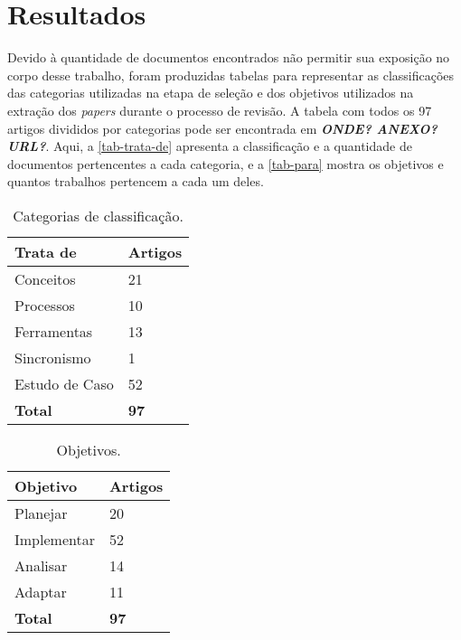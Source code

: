 \documentclass[
article,			%
11pt,				%
oneside,			%
a4paper,			%
english,			%
brazil,				%
sumario=tradicional
]{abntex2}
\begin{document}
  \section{Resultados}

  Devido à quantidade de documentos encontrados não permitir sua exposição no corpo desse trabalho, foram produzidas tabelas para representar as classificações das categorias utilizadas na etapa de seleção e dos objetivos utilizados na extração dos \textit{papers} durante o processo de revisão. A tabela com todos os 97 artigos divididos por categorias pode ser encontrada em \textbf{\emph{ONDE? ANEXO? URL?}}. Aqui, a \autoref{tab-trata-de} apresenta a classificação e a quantidade de documentos pertencentes a cada categoria, e a \autoref{tab-para} mostra os objetivos e quantos trabalhos pertencem a cada um deles.

  \begin{table}[htb]
    \ABNTEXfontereduzida
    \caption[Categorias de classificação]{Categorias de classificação.}
    \label{tab-trata-de}
    \begin{center}
      \begin{tabular}{p{3.0cm}|p{2.0cm}}
        \textbf{Trata de} & \textbf{Artigos} \\
        \hline
        Conceitos & 21 \\
        \hline
        Processos & 10 \\
        \hline
        Ferramentas & 13\\
        \hline
        Sincronismo & 1\\
        \hline
        Estudo de Caso & 52\\
        \hline
        \textbf{Total} & \textbf{97} \\
      \end{tabular}
    \end{center}
  \end{table}

  \begin{table}[htb]
    \ABNTEXfontereduzida
    \caption[Objetivos]{Objetivos.}
    \label{tab-para}
    \begin{center}
      \begin{tabular}{p{3.0cm}|p{2.0cm}}
        \textbf{Objetivo} & \textbf{Artigos} \\
        \hline
        Planejar & 20 \\
        \hline
        Implementar & 52 \\
        \hline
        Analisar & 14 \\
        \hline
        Adaptar & 11 \\
        \hline
        \textbf{Total} & \textbf{97} \\
      \end{tabular}
    \end{center}
  \end{table}
\end{document}
